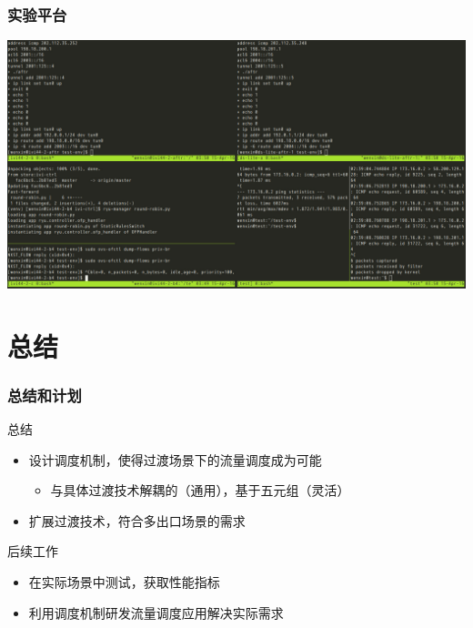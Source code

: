 \documentclass{beamer}
\begin{document}
\begin{frame}
  \frametitle{实验平台}

  \begin{center}
    \includegraphics[width=\textwidth]{figs/test-env.jpeg}
  \end{center}
\end{frame}

\section{总结}
\begin{frame}
  \frametitle{总结和计划}

  \begin{block}{总结}
    \begin{itemize}
    \item 设计调度机制，使得过渡场景下的流量调度成为可能
      \begin{itemize}
      \item 与具体过渡技术解耦的（通用），基于五元组（灵活）
      \end{itemize}
    \item 扩展过渡技术，符合多出口场景的需求
    \end{itemize}
  \end{block}

  \begin{block}{后续工作}
    \begin{itemize}
    \item 在实际场景中测试，获取性能指标
    \item 利用调度机制研发流量调度应用解决实际需求
    \end{itemize}
  \end{block}
\end{frame}
\end{document}
